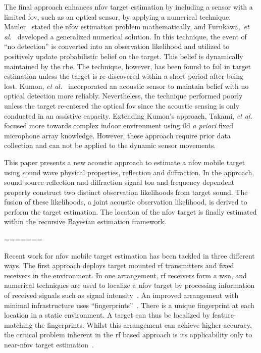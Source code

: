 \documentclass[letterpaper, 10 pt, conference]{ieeeconf}  %
\begin{document}
The final approach enhances \gls{nfov} target estimation by including a sensor with a limited \gls{fov}, such as an optical sensor, by applying a numerical technique. Mauler~\cite{mau03} stated the \gls{nfov} estimation problem mathematically, and Furukawa,~{\it et al.}~\cite{fur06,fur12} developed a generalized numerical solution.  In this technique, the event of ``no detection'' is converted into an observation likelihood and utilized to positively update probabilistic belief on the target. This belief is dynamically maintained by the \gls{rbe}.  The technique, however, has been found to fail in target estimation unless the target is re-discovered within a short period after being lost.  Kumon, {\it et al.}~\cite{kum13}  incorporated an acoustic sensor to maintain belief with no optical detection more reliably. Nevertheless, the technique performed poorly unless the target re-entered the optical \gls{fov} since the acoustic sensing is only conducted in an assistive capacity. Extending Kumon's approach, Takami, {\it et al.}~\cite{takami2015fsr} focused more towards complex indoor environment using \gls{ild} {\it a priori} fixed microphone array knowledge. However, these approach require prior data collection and can not be applied to the dynamic sensor movements.   

This paper presents a new acoustic approach to estimate a \gls{nfov} mobile target using sound wave physical properties, reflection and diffraction. In the approach, sound source reflection and diffraction signal \gls{toa} and frequency dependent property construct two distinct observation likelihoods from target sound. The fusion of these likelihoods, a joint acoustic observation likelihood, is derived to perform the target estimation. The location of the \gls{nfov} target is finally estimated within the recursive Bayesian estimation framework.

=======

Recent work for \acrfull{nfov} mobile target estimation has been tackled in three different ways. The first approach deploys target mounted \gls{rf} transmitters and fixed receivers in the environment.  In one arrangement, \gls{rf} receivers form a \gls{wsn}, and numerical techniques are used to localize a \gls{nfov} target by processing information of received signals such as signal intensity~\cite{Dai2012,Guvenc2009}. An improved arrangement with minimal infrastructure uses ``fingerprints''~\cite{Bahl2000,lad04}. There is a unique fingerprint at each location in a static environment.  A target can thus be localized by feature-matching the fingerprints.  Whilst this arrangement can achieve higher accuracy, the critical problem inherent in the \gls{rf} based approach is its applicability only to near-\gls{nfov} target estimation~\cite{priyantha2005mobile,Seow2008}. 
\end{document}
